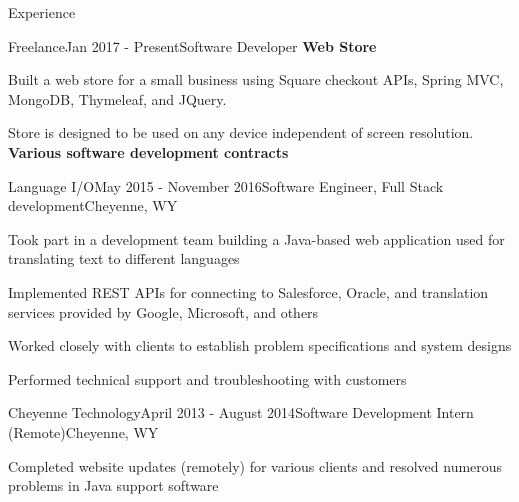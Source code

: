 \documentclass{resume} %
\begin{document}
\begin{rSection}{Experience}
	
		
	\begin{rSubEmploymentSection}{Freelance}{Jan 2017 - Present}{Software Developer}{}
		{\bf Web Store}
		\item Built a web store for a small business using Square checkout APIs, Spring MVC, MongoDB, Thymeleaf, and JQuery. 
		\item Store is designed to be used on any device independent of screen resolution. \\
		{\bf Various software development contracts}
	\end{rSubEmploymentSection}	
		
	\begin{rSubEmploymentSection}{Language I/O}{May 2015 - November 2016}{Software Engineer, Full Stack development}{Cheyenne, WY}
	\item Took part in a development team building a Java-based web application used for translating text to different languages
	\item Implemented REST APIs for connecting to Salesforce, Oracle, and translation services provided by Google, Microsoft, and others
	\item Worked closely with clients to establish problem specifications and system designs
	\item Performed technical support and troubleshooting with customers
	\end{rSubEmploymentSection}
	
	\begin{rSubEmploymentSection}{Cheyenne Technology}{April 2013 - August 2014}{Software Development Intern (Remote)}{Cheyenne, WY}
	\item Completed website updates (remotely) for various clients and resolved numerous problems in Java support software
	\end{rSubEmploymentSection}
	

\end{rSection}
\end{document}
